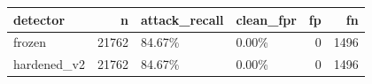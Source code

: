 \begin{tabular}{lrllrr}
\toprule
detector & n & attack_recall & clean_fpr & fp & fn \\
\midrule
frozen & 21762 & 84.67\% & 0.00\% & 0 & 1496 \\
hardened_v2 & 21762 & 84.67\% & 0.00\% & 0 & 1496 \\
\bottomrule
\end{tabular}
